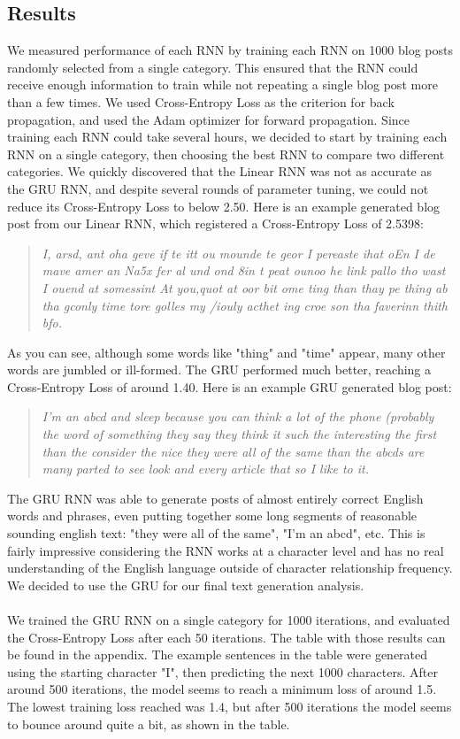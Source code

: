 \documentclass{article}
\begin{document}
\subsection{Results}
We measured performance of each RNN by training each RNN on 1000 blog posts randomly selected from a single category. This ensured that the RNN could receive enough information to train while not repeating a single blog post more than a few times. We used Cross-Entropy Loss as the criterion for back propagation, and used the Adam optimizer for forward propagation. Since training each RNN could take several hours, we decided to start by training each RNN on a single category, then choosing the best RNN to compare two different categories. We quickly discovered that the Linear RNN was not as accurate as the GRU RNN, and despite several rounds of parameter tuning, we could not reduce its Cross-Entropy Loss to below 2.50. Here is an example generated blog post from our Linear RNN, which registered a Cross-Entropy Loss of 2.5398: 
\begin{quote} 
\centering 
\textit{I, arsd, ant oha geve if te itt ou mounde te geor I pereaste ihat oEn I de mave amer an Na5x 
fer al und ond 8in t peat ounoo he link pallo tho  wast I  ouend at somessint At you,quot at oor bit ome ting than thay pe thing ab tha gconly time tore golles my /iouly acthet ing croe son tha faverinn thith bfo. } 
\end{quote}
As you can see, although some words like "thing" and "time" appear, many other words are jumbled or ill-formed. The GRU performed much better, reaching a Cross-Entropy Loss of around 1.40. Here is an example GRU generated blog post:
 \begin{quote} 
\centering 
\textit{I'm an abcd and sleep because you can think a lot of the phone (probably the word of something they say they think it such the interesting the first than the consider the nice they were all of the same than the abcds are many parted to see look and every article that so I like to it. } 
\end{quote}
The GRU RNN was able to generate posts of almost entirely correct English words and phrases, even putting together some long segments of reasonable sounding english text: "they were all of the same", "I'm an abcd", etc. This is fairly impressive considering the RNN works at a character level and has no real understanding of the English language outside of character relationship frequency. We decided to use the GRU for our final text generation analysis. \\ \\
We trained the GRU RNN on a single category for 1000 iterations, and evaluated the Cross-Entropy Loss after each 50 iterations. The table with those results can be found in the appendix. The example sentences in the table were generated using the starting character "I", then predicting the next 1000 characters. After around 500 iterations, the model seems to reach a minimum loss of around 1.5. The lowest training loss reached was 1.4, but after 500 iterations the model seems to bounce around quite a bit, as shown in the table. 
\end{document}
